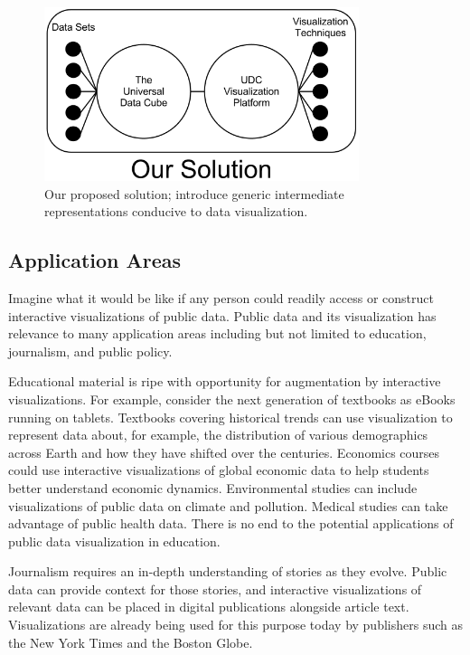 \documentclass[12pt]{article}
\begin{document}
\begin{doublespace}
\begin{figure}[h]
  \centering
  \includegraphics[height=2in]{figures/Solution.png}
  \caption[Proposed solution; generic intermediate representations.]
   {Our proposed solution; introduce generic intermediate representations conducive to data visualization.}
  \label{fig:solution}
\end{figure}

\subsection{Application Areas}
Imagine what it would be like if any person could readily access or construct interactive visualizations of public data. Public data and its visualization has relevance to many application areas including but not limited to education, journalism, and public policy.

Educational material is ripe with opportunity for augmentation by interactive visualizations. For example, consider the next generation of textbooks as eBooks running on tablets. Textbooks covering historical trends can use visualization to represent data about, for example, the distribution of various demographics across Earth and how they have shifted over the centuries. Economics courses could use interactive visualizations of global economic data to help students better understand economic dynamics. Environmental studies can include visualizations of public data on climate and pollution. Medical studies can take advantage of public health data. There is no end to the potential applications of public data visualization in education.

Journalism requires an in-depth understanding of stories as they evolve. Public data can provide context for those stories, and interactive visualizations of relevant data can be placed in digital publications alongside article text. Visualizations are already being used for this purpose today by publishers such as the New York Times and the Boston Globe.


\end{doublespace}
\end{document}
